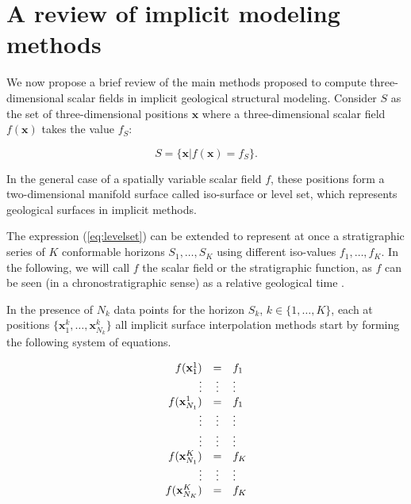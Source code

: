 \documentclass[preprint]{ring20}
\newcommand{\bx}{\mathbf{x}}
\begin{document}
\section{A review of implicit modeling methods}
\label{sec:methods}

We now propose a brief review of the main methods proposed to compute three-dimensional scalar fields in implicit geological structural modeling. 
Consider $S$ as the set of three-dimensional positions $\bx$ where a three-dimensional scalar field $f(\bx)$ takes the value $f_S$: 

\begin{equation}
\label{eq:levelset}
  S = \{\bx | f(\bx) = f_S\}.
\end{equation}

In the general case of a spatially variable scalar field $f$, these positions form a two-dimensional manifold surface called iso-surface or level set, which represents geological surfaces in implicit methods. 

The expression (\ref{eq:levelset}) can be extended to represent 
at once a stratigraphic series of $K$ conformable horizons 
$S_1, \ldots, S_K$ using different iso-values $f_1, \ldots, f_K$. 
In the following, we will call $f$ the scalar field or the stratigraphic function, as $f$ can be seen 
(in a chronostratigraphic sense) as a relative geological time \citep{Mallet2004MG,Lomask2006G,Wu2012G}.

In the presence of $N_k$ data points for the horizon $S_k$, $k \in \{1, \ldots, K\}$, each at positions $\{\mathbf{x}_1^k, \ldots, \mathbf{x}_{N_k}^k\}$ all implicit surface interpolation methods start by forming the following system of equations. 

\begin{equation}
\label{eq:datasystem}
\begin{array}{r c l}
f(\bx_1^1) & = & f_1 \\
\vdots & \vdots & \vdots \\
f(\bx_{N_1}^1) & = & f_1 \\
\vdots & \vdots & \vdots \\
\vdots & \vdots & \vdots \\
f(\bx_{N_1}^K) & = & f_K \\
\vdots & \vdots & \vdots \\
f(\bx_{N_K}^K) & = & f_K \\
\end{array}
\end{equation}
\end{document}
